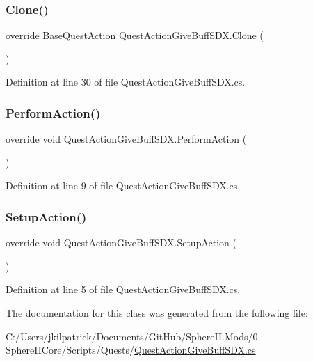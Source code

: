 \subsubsection{\texorpdfstring{Clone()}{Clone()}}
{\footnotesize\ttfamily override Base\+Quest\+Action Quest\+Action\+Give\+Buff\+S\+D\+X.\+Clone (\begin{DoxyParamCaption}{ }\end{DoxyParamCaption})}



Definition at line 30 of file Quest\+Action\+Give\+Buff\+S\+D\+X.\+cs.

\mbox{\label{class_quest_action_give_buff_s_d_x_af255a6a4bd5e446371d231c776413ce0}} 
\subsubsection{\texorpdfstring{PerformAction()}{PerformAction()}}
{\footnotesize\ttfamily override void Quest\+Action\+Give\+Buff\+S\+D\+X.\+Perform\+Action (\begin{DoxyParamCaption}{ }\end{DoxyParamCaption})}



Definition at line 9 of file Quest\+Action\+Give\+Buff\+S\+D\+X.\+cs.

\mbox{\label{class_quest_action_give_buff_s_d_x_ac8a945f1dbf6614856c5d9f02a76d20b}} 
\subsubsection{\texorpdfstring{SetupAction()}{SetupAction()}}
{\footnotesize\ttfamily override void Quest\+Action\+Give\+Buff\+S\+D\+X.\+Setup\+Action (\begin{DoxyParamCaption}{ }\end{DoxyParamCaption})}



Definition at line 5 of file Quest\+Action\+Give\+Buff\+S\+D\+X.\+cs.



The documentation for this class was generated from the following file\+:\begin{DoxyCompactItemize}
\item 
C\+:/\+Users/jkilpatrick/\+Documents/\+Git\+Hub/\+Sphere\+I\+I.\+Mods/0-\/\+Sphere\+I\+I\+Core/\+Scripts/\+Quests/\mbox{\hyperlink{_quest_action_give_buff_s_d_x_8cs}{Quest\+Action\+Give\+Buff\+S\+D\+X.\+cs}}\end{DoxyCompactItemize}
